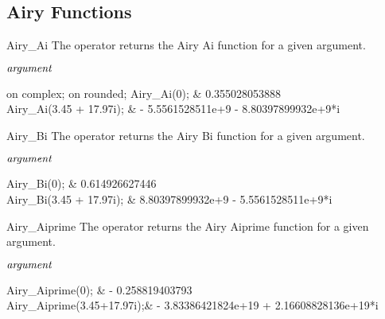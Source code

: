 \subsection{Airy Functions}

\begin{Operator}{Airy_Ai}
The  operator returns the Airy Ai function for a given argument.

\begin{Syntax}
\(\meta{argument}\)
\end{Syntax}

\begin{Examples}
on complex;
on rounded;
Airy_Ai(0);              &   0.355028053888          \\
Airy_Ai(3.45 + 17.97i);   &  - 5.5561528511e+9 - 8.80397899932e+9*i  \\
\end{Examples}

\end{Operator}

\begin{Operator}{Airy_Bi}
The  operator returns the Airy Bi function for a given
argument.

\begin{Syntax}
\(\meta{argument}\)
\end{Syntax}

\begin{Examples}
Airy_Bi(0);              &   0.614926627446          \\
Airy_Bi(3.45 + 17.97i);  &  8.80397899932e+9 - 5.5561528511e+9*i   \\
\end{Examples}

\end{Operator} 

\begin{Operator}{Airy_Aiprime}
The  operator returns the Airy Aiprime function for a
given argument.

\begin{Syntax}
\(\meta{argument}\)
\end{Syntax}

\begin{Examples}
Airy_Aiprime(0);              &  - 0.258819403793           \\
Airy_Aiprime(3.45+17.97i);&  - 3.83386421824e+19 + 2.16608828136e+19*i \\
\end{Examples}

\end{Operator}


